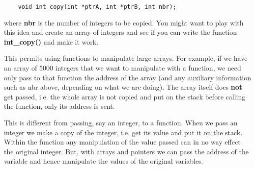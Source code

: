 \begin{verbatim}
    void int_copy(int *ptrA, int *ptrB, int nbr);
\end{verbatim}

where \textbf{nbr} is the number of integers to be copied. You might
want to play with this idea and create an array of integers and see if
you can write the function \textbf{int\_copy()} and make it work.

This permits using functions to manipulate large arrays. For example, if
we have an array of 5000 integers that we want to manipulate with a
function, we need only pass to that function the address of the array
(and any auxiliary information such as nbr above, depending on what we
are doing). The array itself does \textbf{not} get passed, i.e. the
whole array is not copied and put on the stack before calling the
function, only its address is sent.

This is different from passing, say an integer, to a function. When we
pass an integer we make a copy of the integer, i.e. get its value and
put it on the stack. Within the function any manipulation of the value
passed can in no way effect the original integer. But, with arrays and
pointers we can pass the address of the variable and hence manipulate
the values of the original variables.

\begin{comment}
\href{ch4x.htm}{Chapter 4: More on Strings}

\href{pointers.htm}{Back to Table of Contents}
\end{comment}
